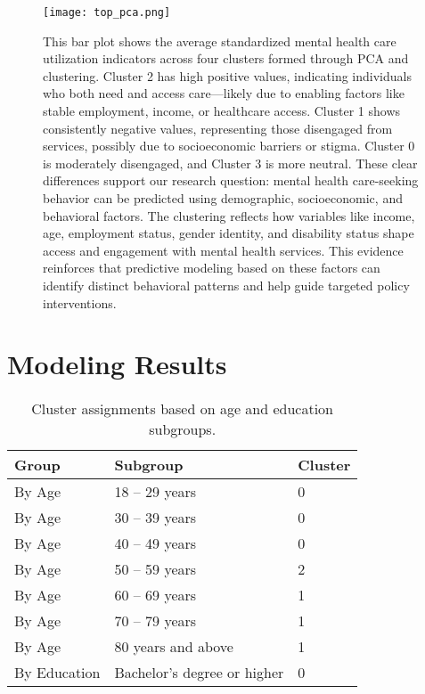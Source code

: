 \documentclass{article}
\begin{document}
\begin{figure}[H]

    \centering
    \begin{adjustbox}{max width=\textwidth}
    \texttt{[image: top\_pca.png]}
    \end{adjustbox}

    \caption{This bar plot shows the average standardized mental health care utilization indicators across four clusters formed through PCA and clustering. Cluster 2 has high positive values, indicating individuals who both need and access care—likely due to enabling factors like stable employment, income, or healthcare access. Cluster 1 shows consistently negative values, representing those disengaged from services, possibly due to socioeconomic barriers or stigma. Cluster 0 is moderately disengaged, and Cluster 3 is more neutral. These clear differences support our research question: mental health care-seeking behavior can be predicted using demographic, socioeconomic, and behavioral factors. The clustering reflects how variables like income, age, employment status, gender identity, and disability status shape access and engagement with mental health services. This evidence reinforces that predictive modeling based on these factors can identify distinct behavioral patterns and help guide targeted policy interventions.}
    \label{fig:yourlabel}
\end{figure}

\section{Modeling Results}
\begin{table}[H]
\centering
\begin{tabular}{|l|l|l|}
\hline
\textbf{Group} & \textbf{Subgroup} & \textbf{Cluster} \\
\hline
By Age & 18 -- 29 years & 0 \\
By Age & 30 -- 39 years & 0 \\
By Age & 40 -- 49 years & 0 \\
By Age & 50 -- 59 years & 2 \\
By Age & 60 -- 69 years & 1 \\
By Age & 70 -- 79 years & 1 \\
By Age & 80 years and above & 1 \\
By Education & Bachelor's degree or higher & 0 \\
\hline
\end{tabular}
\vspace{0.5em}
\caption{Cluster assignments based on age and education subgroups.}
\end{table}
\end{document}
